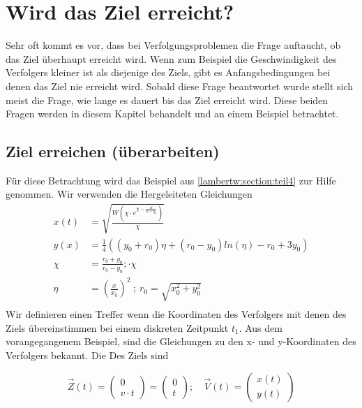 %
%
%
\section{Wird das Ziel erreicht?
\label{lambertw:section:teil1}}

Sehr oft kommt es vor, dass bei Verfolgungsproblemen die Frage auftaucht, ob das Ziel überhaupt erreicht wird.
Wenn zum Beispiel die Geschwindigkeit des Verfolgers kleiner ist als diejenige des Ziels, gibt es Anfangsbedingungen bei denen das Ziel nie erreicht wird.
Sobald diese Frage beantwortet wurde stellt sich meist die Frage, wie lange es dauert bis das Ziel erreicht wird.
Diese beiden Fragen werden in diesem Kapitel behandelt und an einem Beispiel betrachtet.

\subsection{Ziel erreichen (überarbeiten)
\label{lambertw:subsection:ZielErreichen}}
Für diese Betrachtung wird das Beispiel aus \eqref{lambertw:section:teil4} zur Hilfe genommen.
Wir verwenden die Hergeleiteten Gleichungen
\begin{align*}
    x\left(t\right)
    &=
    \sqrt{\frac{W\left(\chi\cdot e^{\chi-\frac{4t}{r_0-y_0}}\right)}{\chi}} \\
    y(x)
    &=
    \frac{1}{4}\left(\left(y_0+r_0\right)\eta+\left(r_0-y_0\right)ln\left(\eta\right)-r_0+3y_0\right) \\
    \chi
    &=
    \frac{r_0+y_0}{r_0-y_0}; \cdot\chi \\
    \eta
    &=
    \left(\frac{x}{x_0}\right)^2 
    \:;\:
    r_0
    =
    \sqrt{x_0^2+y_0^2} \\
\end{align*}
Wir definieren einen Treffer wenn die Koordinaten des Verfolgers mit denen des Ziels übereinstimmen bei einem diskreten Zeitpunkt $t_1$. Aus dem vorangegangenem Beispiel, sind die Gleichungen zu den x- und y-Koordinaten des Verfolgers bekannt. Die Des Ziels sind

\begin{equation}
    \overrightarrow{Z}(t)
    =
    \left( \begin{array}{c} 0 \\ v \cdot t \end{array} \right)
    =
    \left( \begin{array}{c} 0 \\ t \end{array} \right)
    ;\quad
    \overrightarrow{V}(t)
    =
    \left( \begin{array}{c} x(t) \\ y(t) \end{array} \right)
    \label{lambertw:Anfangspunkte}
\end{equation}

